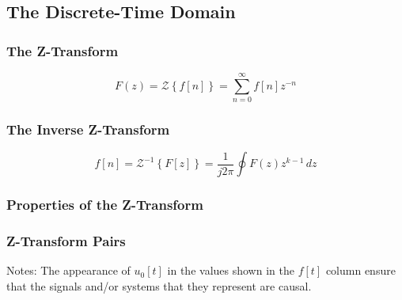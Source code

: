 \subsection*{The Discrete-Time Domain}
\subsubsection*{The Z-Transform}

$$
F(z) = \mathcal{Z}\left\{f[n]\right\} = \sum_{n=0}^{\infty} f[n]z^{-n}
$$

\subsubsection*{The Inverse Z-Transform}

$$
f[n] = \mathcal{Z}^{-1}\left\{F[z]\right\} = \frac{1}{j2\pi}\oint F(z)z^{k-1}\,dz 
$$

\subsubsection*{Properties of the Z-Transform}



\subsubsection*{Z-Transform Pairs}



\noindent Notes: The appearance of $u_0[t]$ in the values shown in the $f[t]$ column ensure that 
the signals and/or systems that they represent are causal.
    
\endinput

